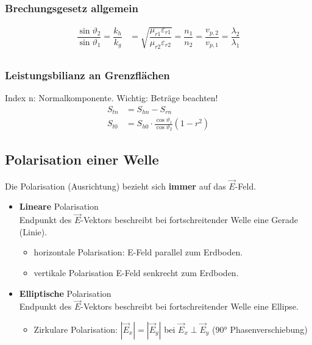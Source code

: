\subsubsection{Brechungsgesetz allgemein}
\begin{align*}
    \dfrac{\sin \vartheta_{2}}{\sin \vartheta_{1}} = \dfrac{k_{h}}{k_{g}} & = \sqrt{\dfrac{\mu_{r 1} \varepsilon_{r 1}}{\mu_{r 2} \varepsilon_{r 2}}} = \dfrac{n_{1}}{n_{2}} = \dfrac{v_{p, 2}}{v_{p, 1}} = \dfrac{\lambda_{2}}{\lambda_{1}} \\
\end{align*}

\subsubsection{Leistungsbilianz an Grenzflächen}
Index n: Normalkomponente. Wichtig: Beträge beachten!
\begin{align*}
	S_{tn} &= S_{hn} - S_{rn}\\ 
	S_{t0} &= S_{h0}\cdot \frac{\cos\vartheta_{1}}{\cos\vartheta_{2}}(1-r^2)
\end{align*}

\subsection{Polarisation einer Welle}
Die Polarisation (Ausrichtung) bezieht sich \textbf{immer} auf das $\vec{E}$-Feld.
\begin{itemize}
	\item \textbf{Lineare} Polarisation\\
	Endpunkt des $\vec{E}$-Vektors beschreibt bei fortschreitender Welle eine Gerade (Linie).
		\begin{itemize}
			\item horizontale Polarisation: E-Feld parallel zum Erdboden.
			\item vertikale Polarisation E-Feld senkrecht zum Erdboden.
		\end{itemize}
	\item \textbf{Elliptische} Polarisation\\
	Endpunkt des $\vec{E}$-Vektors beschreibt bei fortschreitender Welle eine Ellipse.
		\begin{itemize}
			\item Zirkulare Polarisation: $|\vec{E}_x| = |\vec{E}_y|$ bei $ \vec{E}_x \perp \vec{E}_y $ ($ \ang{90}$ Phasenverschiebung)
		\end{itemize}
\end{itemize}



